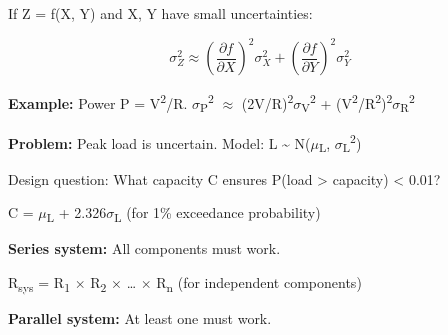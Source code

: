 \begin{Shaded}
\begin{Highlighting}[]
 \OperatorTok{=} \OperatorTok{;}
 \OperatorTok{=} \NormalTok{(}\NormalTok{(} \OperatorTok{{-}} \NormalTok{) }\OperatorTok{\textless{}} \OperatorTok{*}\NormalTok{)}\OperatorTok{;}
\NormalTok{(}\OperatorTok{,} \OperatorTok{*}\NormalTok{)}\OperatorTok{;}
\end{Highlighting}
\end{Shaded}


If Z = f(X, Y) and X, Y have small uncertainties:

\[\sigma_Z^2 \approx \left(\frac{\partial f}{\partial X}\right)^2 \sigma_X^2 + \left(\frac{\partial f}{\partial Y}\right)^2 \sigma_Y^2\]

\textbf{Example:} Power P = V\textsuperscript{2}/R. \ensuremath{\sigma}\textsubscript{P}\textsuperscript{2} \ensuremath{\approx} (2V/R)\textsuperscript{2}\ensuremath{\sigma}\textsubscript{V}\textsuperscript{2} + (V\textsuperscript{2}/R\textsuperscript{2})\textsuperscript{2}\ensuremath{\sigma}\textsubscript{R}\textsuperscript{2}



\textbf{Problem:} Peak load is uncertain. Model: L \textasciitilde{} N(\ensuremath{\mu}\textsubscript{L}, \ensuremath{\sigma}\textsubscript{L}\textsuperscript{2})

Design question: What capacity C ensures P(load \textgreater{} capacity) \textless{} 0.01?

C = \ensuremath{\mu}\textsubscript{L} + 2.326\ensuremath{\sigma}\textsubscript{L} (for 1\% exceedance probability)


\textbf{Series system:} All components must work.

R\textsubscript{sys} = R\textsubscript{1} \ensuremath{\times} R\textsubscript{2} \ensuremath{\times} … \ensuremath{\times} R\textsubscript{n} (for independent components)

\textbf{Parallel system:} At least one must work.

